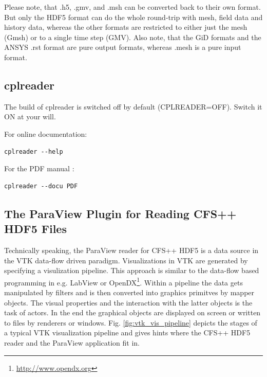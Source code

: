 \noindent Please note, that .h5, .gmv, and .msh can be converted back to their
own format.  But  only the HDF5 format can do the  whole round-trip with mesh,
field  data and  history data,  whereas the  other formats  are  restricted to
either just the  mesh (Gmsh) or to  a single time step (GMV).  Also note, that
the GiD  formats and the  ANSYS .rst format  are pure output  formats, whereas
.mesh is a pure input format.

\subsection{cplreader}
\label{sec:cplreader}

The build of  cplreader is switched off by  default (CPLREADER=OFF). Switch it
ON at your will.

\noindent For online documentation:
\begin{verbatim}
cplreader --help
\end{verbatim}

\noindent For the PDF manual \cite{cplreadermanual}:
\begin{verbatim}
cplreader --docu PDF
\end{verbatim}

\newpage
\subsection{The ParaView Plugin for Reading CFS++ HDF5 Files}

Technically speaking, the  ParaView reader for CFS++ HDF5 is  a data source in
the VTK  data-flow driven  paradigm.  Visualizations in  VTK are  generated by
specifying a visulization pipeline.  This approach is similar to the data-flow
based         programming          in         e.g.          LabView         or
OpenDX\footnote{\url{http://www.opendx.org}}. Within a  pipeline the data gets
manipulated by filters and is then converted into graphics primitves by mapper
objects. The visual properties and  the interaction with the latter objects is
the task of  actors. In the end the graphical objects  are displayed on screen
or      written      to      files      by     renderers      or      windows.
Fig.   \ref{fig:vtk_vis_pipeline}  depicts  the  stages  of  a  typical  VTK
visualization pipeline  and gives  hints where the  CFS++ HDF5 reader  and the
ParaView application fit in.

